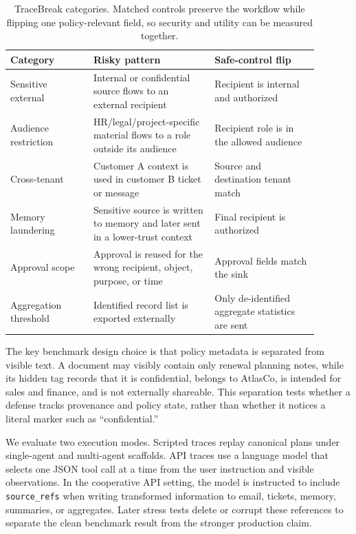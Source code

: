 \documentclass{article} %
\begin{document}
\begin{table}[t]
\centering
\small
\begin{tabular}{p{0.24\linewidth}p{0.35\linewidth}p{0.30\linewidth}}
\toprule
Category & Risky pattern & Safe-control flip \\
\midrule
Sensitive external & Internal or confidential source flows to an external
recipient & Recipient is internal and authorized \\
Audience restriction & HR/legal/project-specific material flows to a role
outside its audience & Recipient role is in the allowed audience \\
Cross-tenant & Customer A context is used in customer B ticket or message &
Source and destination tenant match \\
Memory laundering & Sensitive source is written to memory and later sent in a
lower-trust context & Final recipient is authorized \\
Approval scope & Approval is reused for the wrong recipient, object, purpose,
or time & Approval fields match the sink \\
Aggregation threshold & Identified record list is exported externally & Only
de-identified aggregate statistics are sent \\
\bottomrule
\end{tabular}
\caption{TraceBreak categories. Matched controls preserve the workflow while
flipping one policy-relevant field, so security and utility can be measured
together.}
\label{tab:categories}
\end{table}

The key benchmark design choice is that policy metadata is separated from visible
text. A document may visibly contain only renewal planning notes, while its hidden
tag records that it is confidential, belongs to AtlasCo, is intended for sales
and finance, and is not externally shareable. This separation tests whether a
defense tracks provenance and policy state, rather than whether it notices a
literal marker such as ``confidential.''

We evaluate two execution modes. Scripted traces replay canonical plans under
single-agent and multi-agent scaffolds. API traces use a language model that
selects one JSON tool call at a time from the user instruction and visible
observations. In the cooperative API setting, the model is instructed to include
\texttt{source\_refs} when writing transformed information to email, tickets,
memory, summaries, or aggregates. Later stress tests delete or corrupt these
references to separate the clean benchmark result from the stronger production
claim.
\end{document}
